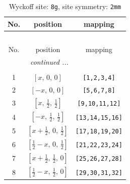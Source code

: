 \documentclass[fleqn,8pt]{jsarticle}
\begin{document}
\begin{longtable}{ccc}
\caption{Wyckoff site: {\tt 8g}, site symmetry: {\tt 2mm}}
 \\
 \hline \hline
No. & position & mapping \\ \hline \endfirsthead

\multicolumn{2}{l}{\tablename\ \thetable{}} \\
 \hline \hline
No. & position & mapping \\ \hline \endhead

 \hline \hline
\multicolumn{2}{r}{\footnotesize\it continued ...} \\ \endfoot

 \hline \hline
\multicolumn{2}{r}{} \\ \endlastfoot

1 & $\left[ x,\, 0,\, 0 \right]$ & {\tt [1,2,3,4]} \\ \hline
2 & $\left[ - x,\, 0,\, 0 \right]$ & {\tt [5,6,7,8]} \\ \hline
3 & $\left[ x,\, \frac{1}{2},\, \frac{1}{2} \right]$ & {\tt [9,10,11,12]} \\ \hline
4 & $\left[ - x,\, \frac{1}{2},\, \frac{1}{2} \right]$ & {\tt [13,14,15,16]} \\ \hline
5 & $\left[ x + \frac{1}{2},\, 0,\, \frac{1}{2} \right]$ & {\tt [17,18,19,20]} \\ \hline
6 & $\left[ \frac{1}{2} - x,\, 0,\, \frac{1}{2} \right]$ & {\tt [21,22,23,24]} \\ \hline
7 & $\left[ x + \frac{1}{2},\, \frac{1}{2},\, 0 \right]$ & {\tt [25,26,27,28]} \\ \hline
8 & $\left[ \frac{1}{2} - x,\, \frac{1}{2},\, 0 \right]$ & {\tt [29,30,31,32]} \\
\end{longtable}
\renewcommand{\arraystretch}{1.2}
\end{document}
